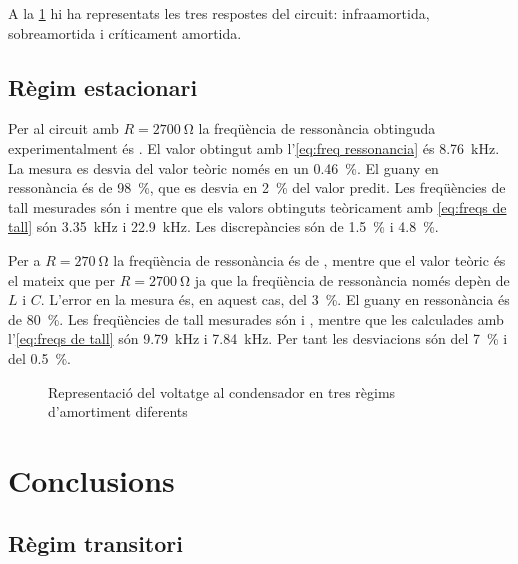 A la \cref{fig:oscilacions} hi ha representats les tres respostes del circuit: infraamortida, sobreamortida i críticament amortida.

\subsection{Règim estacionari}
Per al circuit amb \( R = \SI{2700}{\ohm} \) la freqüència de ressonància obtinguda experimentalment és . El valor obtingut amb l'\cref{eq:freq ressonancia} és \SI{8.76}{kHz}. La mesura es desvia del valor teòric només en un \SI{0.46}{\percent}. El guany en ressonància és de \SI{98}{\percent}, que es desvia en \SI{2}{\percent} del valor predit. Les freqüències de tall mesurades són  i  mentre que els valors obtinguts teòricament amb \cref{eq:freqs de tall} són \SI{3.35}{kHz} i \SI{22.9}{kHz}. Les discrepàncies són de \SI{1.5}{\percent} i \SI{4.8}{\percent}.

Per a \( R = \SI{270}{\ohm} \) la freqüència de ressonància és de , mentre que el valor teòric és el mateix que per \( R = \SI{2700}{\ohm} \) ja que la freqüència de ressonància només depèn de \( L \) i \( C \). L'error en la mesura és, en aquest cas, del \SI{3}{\percent}.  El guany en ressonància és de \SI{80}{\percent}. Les freqüències de tall mesurades són  i , mentre que les calculades amb l'\cref{eq:freqs de tall} són \SI{9.79}{kHz} i \SI{7.84}{kHz}. Per tant les desviacions són del \SI{7}{\percent} i del \SI{0.5}{\percent}. 

\begin{figure}[htb]
	\centering \small \sffamily
	
	\caption{Representació del voltatge al condensador en tres règims d'amortiment diferents}
	\label{fig:oscilacions}
\end{figure}

\section{Conclusions}
\subsection{Règim transitori}

